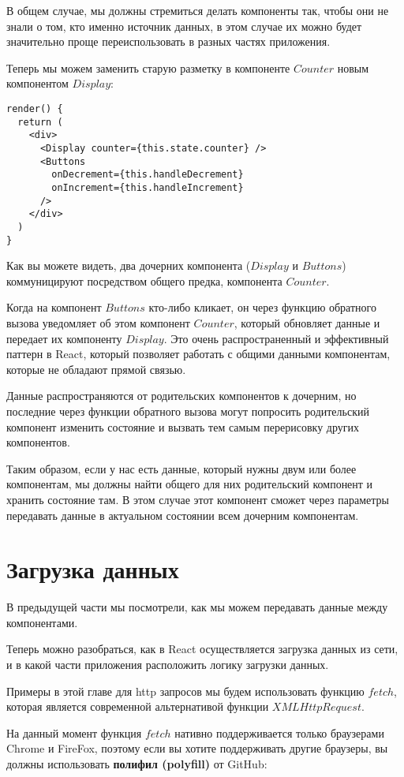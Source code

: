 В общем случае, мы должны стремиться делать компоненты так, чтобы они не знали о том, кто именно источник данных, в этом случае их можно будет значительно проще переиспользовать в разных частях приложения.

Теперь мы можем заменить старую разметку в компоненте $Counter$ новым компонентом $Display$:

\begin{lstlisting}
render() {
  return (
    <div>
      <Display counter={this.state.counter} />
      <Buttons
        onDecrement={this.handleDecrement}
        onIncrement={this.handleIncrement}
      />
    </div> 
  )
}
\end{lstlisting}

Как вы можете видеть, два дочерних компонента ($Display$ и $Buttons$) коммуницируют посредством общего предка, компонента $Counter$.

Когда на компонент $Buttons$ кто-либо кликает, он через функцию обратного вызова уведомляет об этом компонент $Counter$, который обновляет данные и передает их компоненту $Display$. Это очень распространенный и эффективный паттерн в React, который позволяет работать с общими данными компонентам, которые не обладают прямой связью.

Данные распространяются от родительских компонентов к дочерним, но последние через функции обратного вызова могут попросить родительский компонент изменить состояние и вызвать тем самым перерисовку других компонентов.

Таким образом, если у нас есть данные, который нужны двум или более компонентам, мы должны найти общего для них родительский компонент и хранить состояние там. В этом случае этот компонент сможет через параметры передавать данные в актуальном состоянии всем дочерним компонентам.

\section{Загрузка данных}

В предыдущей части мы посмотрели, как мы можем передавать данные между компонентами.

Теперь можно разобраться, как в React осуществляется загрузка данных из сети, и в какой части приложения расположить логику загрузки данных.

Примеры в этой главе для http запросов мы будем использовать функцию $fetch$, которая является современной альтернативой функции $XMLHttpRequest$.

На данный момент функция $fetch$ нативно поддерживается только браузерами Chrome и FireFox, поэтому если вы хотите поддерживать другие браузеры, вы должны использовать \textbf{полифил (polyfill)} от GitHub:

